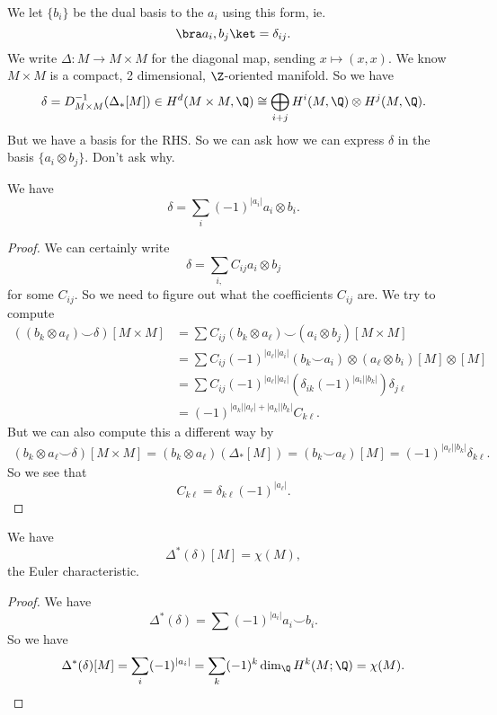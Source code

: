 \documentclass[a4paper]{article}
\begin{document}
We let $\{b_i\}$ be the dual basis to the $a_i$ using this form, ie.
\[
  \bra a_i, b_j\ket = \delta_{ij}.
\]
We write $\Delta: M \to M \times M$ for the diagonal map, sending $x \mapsto (x, x)$. We know $M \times M$ is a compact, 2 dimensional, $\Z$-oriented manifold. So we have
\[
  \delta = D_{M \times M}^{-1}(\Delta_*[M]) \in H^d(M \times M, \Q) \cong \bigoplus_{i + j}H^i(M, \Q) \otimes H^j(M, \Q).
\]
But we have a basis for the RHS. So we can ask how we can express $\delta$ in the basis $\{a_i \otimes b_j\}$. Don't ask why.

\begin{thm}
  We have
  \[
    \delta = \sum_i (-1)^{|a_i|} a_i \otimes b_i.
  \]
\end{thm}

\begin{proof}
  We can certainly write
  \[
    \delta = \sum_{i, } C_{ij} a_i \otimes b_j
  \]
  for some $C_{ij}$. So we need to figure out what the coefficients $C_{ij}$ are. We try to compute
  \begin{align*}
    ((b_k \otimes a_\ell) \smile \delta)[M \times M] &= \sum C_{ij} (b_k \otimes a_\ell) \smile (a_i \otimes b_j) [M \times M]\\
    &= \sum C_{ij} (-1)^{|a_\ell||a_i|} (b_k \smile a_i) \otimes (a_\ell \otimes b_i) [M] \otimes [M]\\
    &= \sum C_{ij} (-1)^{|a_\ell||a_i|} (\delta_{ik}(-1)^{|a_i||b_k|}) \delta_{j \ell}\\
    &= (-1)^{|a_k||a_\ell| + |a_k| |b_k|} C_{k\ell}.
  \end{align*}
  But we can also compute this a different way by
  \begin{align*}
    (b_k \otimes a_\ell \smile \delta)[M \times M] = (b_k \otimes a_\ell)(\Delta_*[M]) = (b_k \smile a_\ell)[M] = (-1)^{|a_\ell||b_k|} \delta_{k\ell}.
  \end{align*}
  So we see that
  \[
    C_{k\ell} = \delta_{k\ell}(-1)^{|a_\ell|}.
  \]
\end{proof}

\begin{cor}
  We have
  \[
    \Delta^*(\delta)[M] = \chi(M),
  \]
  the Euler characteristic.
\end{cor}

\begin{proof}
  We have
  \[
    \Delta^*(\delta) = \sum (-1)^{|a_i|} a_i \smile b_i.
  \]
  So we have
  \[
    \Delta^*(\delta)[M] = \sum_i (-1)^{|a_i|} = \sum_k (-1)^k \dim_\Q H^k(M; \Q) = \chi(M).
  \]
\end{proof}
\end{document}
